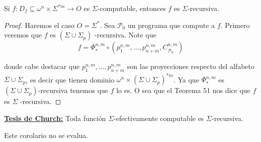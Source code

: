   \begin{corollary}
    Si \(f:D_{f}\subseteq \omega ^{n}\times \Sigma ^{\ast m}\rightarrow O\) es \( \Sigma \)-computable, 
    entonces \(f\) es \(\Sigma \)-recursiva.
  \begin{proof}
    Haremos el caso \(O=\Sigma ^{\ast }\). Sea \(\mathcal{P}_{0}\) un programa que compute a \(f\).
    Primero veremos que \(f\) es \((\Sigma \cup \Sigma _{p})\) -recursiva. Note que
    \[
      \displaystyle f=\Phi _{\ast }^{n,m}\circ \left( p_{1}^{n,m},...,p_{n+m}^{n,m},C_{\mathcal{P }_{0}}^{n,m}\right)
    \]

    donde cabe destacar que \(p_{1}^{n,m},...,p_{n+m}^{n,m}\) son las proyecciones respecto del alfabeto 
    \(\Sigma \cup \Sigma _{p}\), es decir que tienen dominio \(\omega ^{n}\times (\Sigma \cup \Sigma _{p})^{\ast m}\).
     Ya que \(\Phi _{\ast }^{n,m}\) es \((\Sigma \cup \Sigma _{p})\)-recursiva tenemos que \(f\) lo es.
      O sea que el Teorema 51 nos dice que \(f\) es \(\Sigma \) -recursiva.
  \end{proof}
  \end{corollary}


  \noindent \textbf{\underline{Tesis de Church:}} Toda función \(\Sigma \)-efectivamente computable es \(\Sigma \)-recursiva.

  \begin{corollary}
    \par Este corolario no se evalua.
  \end{corollary}

